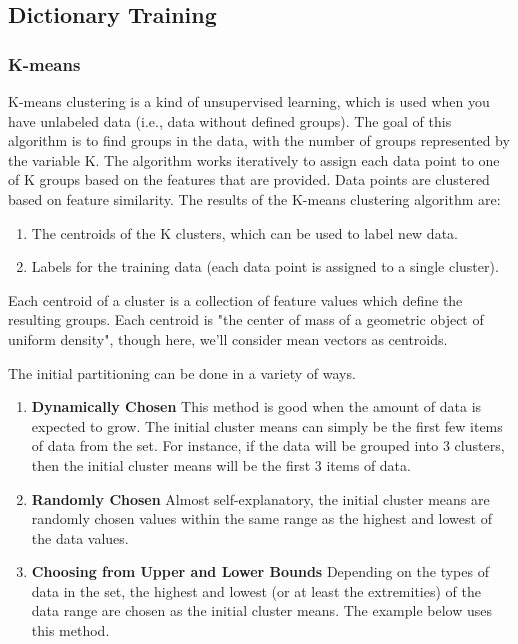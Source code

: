 \subsection{Dictionary Training}
\subsubsection{K-means}

K-means clustering is a kind of unsupervised learning, which is used when you have unlabeled data (i.e., data without defined groups). The goal of this algorithm is to find groups in the data, with the number of groups represented by the variable K. The algorithm works iteratively to assign each data point to one of K groups based on the features that are provided. Data points are clustered based on feature similarity. The results of the K-means clustering algorithm are:
\begin{enumerate}
    \item The centroids of the K clusters, which can be used to label new data.
    \item Labels for the training data (each data point is assigned to a single cluster).
\end{enumerate}

Each centroid of a cluster is a collection of feature values which define the resulting groups. Each centroid is "the center of mass of a geometric object of uniform density", though here, we'll consider mean vectors as centroids.

The initial partitioning can be done in a variety of ways.
\begin{enumerate}
    \item \textbf{Dynamically Chosen} This method is good when the amount of data is expected to grow. The initial cluster means can simply be the first few items of data from the set. For instance, if the data will be grouped into 3 clusters, then the initial cluster means will be the first 3 items of data.
    \item \textbf{Randomly Chosen} Almost self-explanatory, the initial cluster means are randomly chosen values within the same range as the highest and lowest of the data values.
    \item \textbf{Choosing from Upper and Lower Bounds} Depending on the types of data in the set, the highest and lowest (or at least the extremities) of the data range are chosen as the initial cluster means. The example below uses this method.
\end{enumerate}


